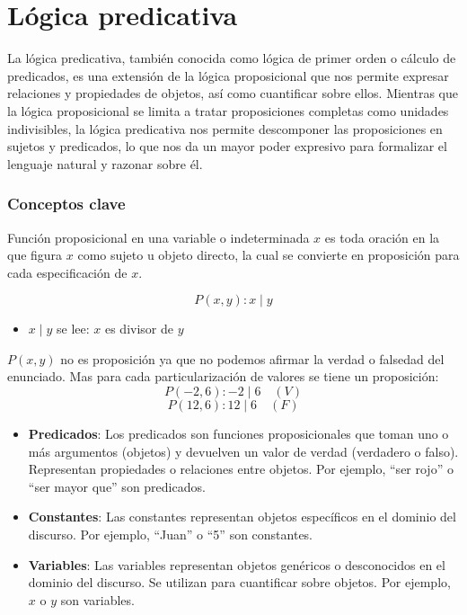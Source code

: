 \section{Lógica predicativa}
La lógica predicativa, también conocida como lógica de primer orden o cálculo de predicados, es una extensión de la lógica proposicional que nos permite expresar relaciones y propiedades de objetos, así como cuantificar sobre ellos. Mientras que la lógica proposicional se limita a tratar proposiciones completas como unidades indivisibles, la lógica predicativa nos permite descomponer las proposiciones en sujetos y predicados, lo que nos da un mayor poder expresivo para formalizar el lenguaje natural y razonar sobre él.


\subsubsection{Conceptos clave}
\vspace{1em}
\begin{fmd-definition} 
	Función proposicional en una variable o indeterminada $x$ es toda oración en la que figura $x$ como sujeto u objeto directo, la cual se convierte en proposición para cada especificación de $x$.
\end{fmd-definition}

\begin{fmd-example}
	\[ P(x, y): x \mid y \]
	
	\begin{itemize}
		\item $x \mid y$ se lee: $x$ es divisor de $y$
	\end{itemize}
	
	$P(x, y)$ no es proposición ya que no podemos afirmar la verdad o falsedad del enunciado. Mas para cada particularización de valores se tiene un proposición:
	\[ 
	P(-2, 6): -2 \mid 6 \quad (V)
	\]
	\[ P(12, 6): 12 \mid 6 \quad (F) \]
\end{fmd-example}

\begin{itemize}
	\item \textbf{Predicados}: Los predicados son funciones proposicionales que toman uno o más argumentos (objetos) y devuelven un valor de verdad (verdadero o falso). Representan propiedades o relaciones entre objetos. Por ejemplo, ``ser rojo'' o ``ser mayor que'' son predicados. 
	\item \textbf{Constantes}: Las constantes representan objetos específicos en el dominio del discurso. Por ejemplo, ``Juan'' o ``5'' son constantes.
	\item \textbf{Variables}: Las variables representan objetos genéricos o desconocidos en el dominio del discurso. Se utilizan para cuantificar sobre objetos. Por ejemplo, $x$ o $y$ son variables.
\end{itemize}

